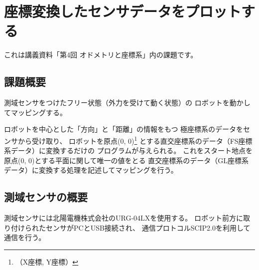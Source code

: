 \documentclass[main]{subfiles}
\begin{document}
\chapter{座標変換したセンサデータをプロットする}

これは講義資料「第4回 オドメトリと座標系」内の課題です。

\section{課題概要}
測域センサをつけたフリー状態（外力を受けて動く状態）の
ロボットを動かしてマッピングする。

ロボットを中心とした「方向」と「距離」の情報をもつ
極座標系のデータをセンサから受け取り、
ロボットを原点(0, 0)\footnote{（X座標, Y座標）}
とする直交座標系のデータ（FS座標系データ）に変換するだけの
プログラムが与えられる。
これをスタート地点を原点(0, 0)とする平面に関して唯一の値をとる
直交座標系のデータ（GL座標系データ）に変換する処理を記述してマッピングを行う。

\section{測域センサの概要}
測域センサには北陽電機株式会社のURG-04LXを使用する。
ロボット前方に取り付けられたセンサがPCとUSB接続され、
通信プロトコルSCIP2.0を利用して通信を行う。
\end{document}
